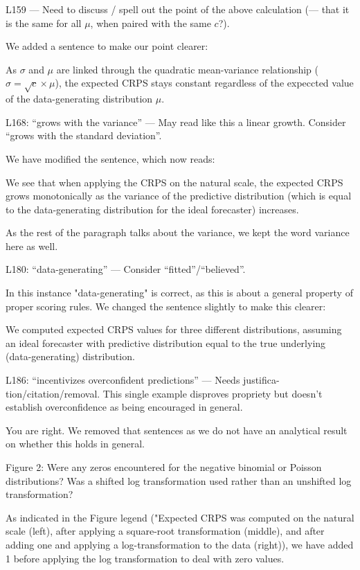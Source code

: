 \documentclass{article}
\newcommand{\black}{\color{black}}
\newcommand{\blue}{\color{blue}}
\newcommand{\indented}{\setlength{\leftskip}{1cm}}
\newcommand{\notindented}{\setlength{\leftskip}{0cm}}
\begin{document}
\blue
L159 — Need to discuss / spell out the point of the above calculation (— that it is the same for all $\mu$, when paired with the same $c$?).

\black
We added a sentence to make our point clearer: 

\indented
As $\sigma$ and $\mu$ are linked through the quadratic mean-variance relationship ($\sigma = \sqrt{c} \times \mu$), the expected CRPS stays constant regardless of the expeccted value of the data-generating distribution $\mu$. 

\notindented

\blue
L168: “grows with the variance” — May read like this a linear growth. Consider “grows with the standard deviation”.

\black
We have modified the sentence, which now reads: 

\indented
We see that when applying the CRPS on the natural scale, the expected CRPS grows monotonically as the variance of the predictive distribution (which is equal to the data-generating distribution for the ideal forecaster) increases.

\notindented
As the rest of the paragraph talks about the variance, we kept the word variance here as well. 

\blue

L180: “data-generating” — Consider “fitted”/“believed”.

\black
In this instance "data-generating" is correct, as this is about a general property of proper scoring rules. We changed the sentence slightly to make this clearer: 

\indented
We computed expected CRPS values  for three different distributions, assuming an ideal forecaster with predictive distribution equal to the true underlying (data-generating) distribution.


\notindented
\blue
L186: “incentivizes overconfident predictions” — Needs justifica- tion/citation/removal. This single example disproves propriety but doesn’t establish overconfidence as being encouraged in general.

\black
You are right. We removed that sentences as we do not have an analytical result on whether this holds in general. 

\blue
Figure 2: Were any zeros encountered for the negative binomial or Poisson distributions? Was a shifted log transformation used rather than an unshifted log transformation?

\black 
As indicated in the Figure legend ("Expected CRPS was computed on the natural scale (left), after applying a square-root transformation (middle), and after adding one and applying a log-transformation to the data (right)), we have added 1 before applying the log transformation to deal with zero values. 
\end{document}
